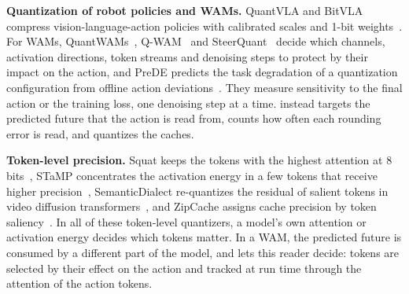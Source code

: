 \noindent\textbf{Quantization of robot policies and WAMs.}
QuantVLA and BitVLA compress vision-language-action policies with calibrated scales and 1-bit weights~\cite{zhang2026quantvla,wang2025bitvla}.
For WAMs, QuantWAMs~\cite{zhou2026quantwams}, Q-WAM~\cite{akbari2026qwam} and SteerQuant~\cite{wang2026steerquant} decide which channels, activation directions, token streams and denoising steps to protect by their impact on the action, and PreDE predicts the task degradation of a quantization configuration from offline action deviations~\cite{xu2026prede}.
They measure sensitivity to the final action or the training loss, one denoising step at a time.
\method instead targets the predicted future that the action is read from, counts how often each rounding error is read, and quantizes the caches.

\noindent\textbf{Token-level precision.}
Squat keeps the tokens with the highest attention at 8 bits~\cite{shen2024squat}, STaMP concentrates the activation energy in a few tokens that receive higher precision~\cite{federici2026stamp}, SemanticDialect re-quantizes the residual of salient tokens in video diffusion transformers~\cite{jang2026semanticdialect}, and ZipCache assigns cache precision by token saliency~\cite{he2024zipcache}.
In all of these token-level quantizers, a model's own attention or activation energy decides which tokens matter.
In a WAM, the predicted future is consumed by a different part of the model, and \method lets this reader decide: tokens are selected by their effect on the action and tracked at run time through the attention of the action tokens.
